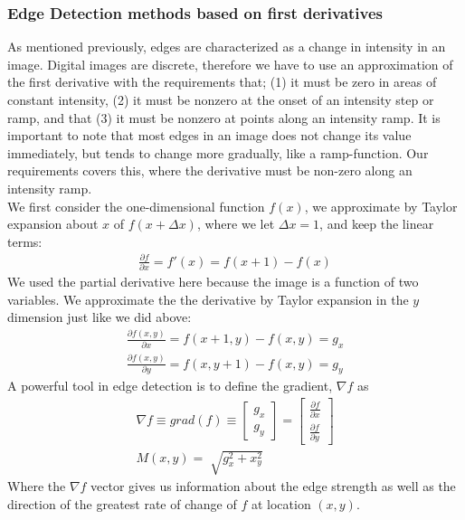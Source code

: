 \subsubsection{Edge Detection methods based on first derivatives}
As mentioned previously, edges are characterized as a change in intensity in an image. Digital images are discrete, therefore we have to use an approximation of the first derivative with the requirements that; (1) it must be zero in areas of constant intensity, (2) it must be nonzero at the onset of an intensity step or ramp, and that (3) it must be nonzero at points along an intensity ramp\cite{g}. It is important to note that most edges in an image does not change its value immediately, but tends to change more gradually, like a ramp-function. Our requirements covers this, where the derivative must be non-zero along an intensity ramp.\\
We first consider the one-dimensional function $f(x)$, we approximate by Taylor expansion about $x$ of $f(x+\Delta x)$, where we let $\Delta x = 1$, and keep the linear terms:
\begin{align}
    \frac{\partial f}{\partial x} = f'(x) = f(x +1) - f(x)
\end{align}
We used the partial derivative here because the image is a function of two variables. We approximate the the derivative by Taylor expansion in the $y$ dimension just like we did above:
\begin{align}
\frac{\partial f(x,y)}{\partial x} = f(x+1,y)-f(x,y) = g_x\\
\frac{\partial f(x,y)}{\partial y} = f(x,y+1)-f(x,y) = g_y
\end{align}
A powerful tool in edge detection is to define the gradient, $\nabla f$ as
\begin{align}
\nabla f \equiv grad(f) \equiv 
\begin{bmatrix}
g_x \\
g_y
\end{bmatrix}
= 
\begin{bmatrix}
\frac{\partial f}{\partial x}\\
\frac{\partial f}{\partial y}
\end{bmatrix}\\
M(x,y) = \sqrt[]{g_x^2 +x_y^2}
\label{eq:magnitude}
\end{align}
Where the $\nabla f$ vector gives us information about the edge strength as well as the direction of the greatest rate of change of $f$ at location $(x,y)$.\\

